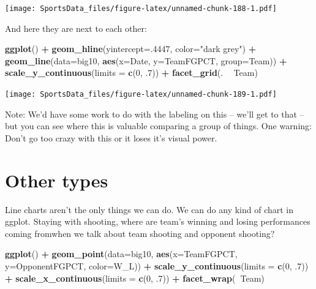 \documentclass[]{book}
\newenvironment{Shaded}{\begin{snugshade}}{\end{snugshade}}
\newcommand{\KeywordTok}[1]{\textcolor[rgb]{0.13,0.29,0.53}{\textbf{#1}}}
\newcommand{\DataTypeTok}[1]{\textcolor[rgb]{0.13,0.29,0.53}{#1}}
\newcommand{\DecValTok}[1]{\textcolor[rgb]{0.00,0.00,0.81}{#1}}
\newcommand{\StringTok}[1]{\textcolor[rgb]{0.31,0.60,0.02}{#1}}
\newcommand{\OperatorTok}[1]{\textcolor[rgb]{0.81,0.36,0.00}{\textbf{#1}}}
\newcommand{\NormalTok}[1]{#1}
\begin{document}
\texttt{[image: SportsData\_files/figure-latex/unnamed-chunk-188-1.pdf]}

And here they are next to each other:

\begin{Shaded}
\begin{Highlighting}[]
\KeywordTok{ggplot}\NormalTok{() }\OperatorTok{+}\StringTok{ }\KeywordTok{geom_hline}\NormalTok{(}\DataTypeTok{yintercept=}\NormalTok{.}\DecValTok{4447}\NormalTok{, }\DataTypeTok{color=}\StringTok{"dark grey"}\NormalTok{) }\OperatorTok{+}\StringTok{ }\KeywordTok{geom_line}\NormalTok{(}\DataTypeTok{data=}\NormalTok{big10, }\KeywordTok{aes}\NormalTok{(}\DataTypeTok{x=}\NormalTok{Date, }\DataTypeTok{y=}\NormalTok{TeamFGPCT, }\DataTypeTok{group=}\NormalTok{Team)) }\OperatorTok{+}\StringTok{ }\KeywordTok{scale_y_continuous}\NormalTok{(}\DataTypeTok{limits =} \KeywordTok{c}\NormalTok{(}\DecValTok{0}\NormalTok{, .}\DecValTok{7}\NormalTok{)) }\OperatorTok{+}\StringTok{ }\KeywordTok{facet_grid}\NormalTok{(. }\OperatorTok{~}\StringTok{ }\NormalTok{Team)}
\end{Highlighting}
\end{Shaded}

\texttt{[image: SportsData\_files/figure-latex/unnamed-chunk-189-1.pdf]}

Note: We'd have some work to do with the labeling on this -- we'll get
to that -- but you can see where this is valuable comparing a group of
things. One warning: Don't go too crazy with this or it loses it's
visual power.

\section{Other types}\label{other-types}

Line charts aren't the only things we can do. We can do any kind of
chart in ggplot. Staying with shooting, where are team's winning and
losing performances coming fromwhen we talk about team shooting and
opponent shooting?

\begin{Shaded}
\begin{Highlighting}[]
\KeywordTok{ggplot}\NormalTok{() }\OperatorTok{+}\StringTok{ }\KeywordTok{geom_point}\NormalTok{(}\DataTypeTok{data=}\NormalTok{big10, }\KeywordTok{aes}\NormalTok{(}\DataTypeTok{x=}\NormalTok{TeamFGPCT, }\DataTypeTok{y=}\NormalTok{OpponentFGPCT, }\DataTypeTok{color=}\NormalTok{W_L)) }\OperatorTok{+}\StringTok{ }\KeywordTok{scale_y_continuous}\NormalTok{(}\DataTypeTok{limits =} \KeywordTok{c}\NormalTok{(}\DecValTok{0}\NormalTok{, .}\DecValTok{7}\NormalTok{)) }\OperatorTok{+}\StringTok{ }\KeywordTok{scale_x_continuous}\NormalTok{(}\DataTypeTok{limits =} \KeywordTok{c}\NormalTok{(}\DecValTok{0}\NormalTok{, .}\DecValTok{7}\NormalTok{)) }\OperatorTok{+}\StringTok{ }\KeywordTok{facet_wrap}\NormalTok{(}\OperatorTok{~}\NormalTok{Team)}
\end{Highlighting}
\end{Shaded}
\end{document}
